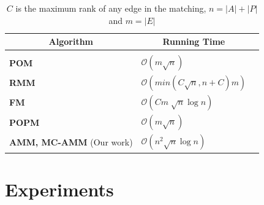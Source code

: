 \documentclass[letterpaper]{article} %
\begin{document}
\begin{table}[h]
\small
\begin{center}
\begin{tabular}{lll}
\multicolumn{1}{c}{\bf Algorithm}
&\multicolumn{1}{c}{\bf Running Time}
\\ \hline  \\
\textbf{POM}  \cite{pareto} & $\mathcal{O}(m\sqrt{n})$\\
\textbf{RMM} \cite{irving2004rank} & $\mathcal{O}(min(C\sqrt{n}, n+C)m)$\\
\textbf{FM}  \cite{fair} & ${\mathcal{O}}(Cm\sqrt[]{n}\log n)$\\
\textbf{POPM}  \cite{pop-bounded} & $\mathcal{O}(m\sqrt{n})$\\
\textbf{AMM, MC-AMM} (Our work) & ${\mathcal{O}}(n^2\sqrt{n}\log n)$\\
\end{tabular}
\end{center}
\caption{$C$ is the maximum rank of any edge in the matching, $n=|A|+|P|$ and $m=|E|$}
\label{tab:algorithms}
\end{table}



\section{Experiments}
\end{document}
